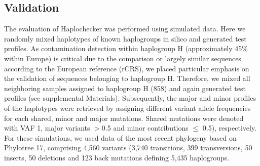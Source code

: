 \subsection{Validation}
The evaluation of Haplochecker  was performed using simulated data. Here we randomly mixed haplotypes of known haplogroups in silico and generated test profiles. As contamination detection within haplogroup H (approximately 45\% within Europe) is critical due to the comparison or largely similar sequences according to the European reference (rCRS), we placed particular emphasis on the validation of sequences belonging to haplogroup H. Therefore, we mixed all neighboring samples assigned to haplogroup H (858) and again generated test profiles (see supplemental Materials). Subsequently, the major and minor profiles of the haplotypes were retrieved by assigning different variant allele frequencies for each shared, minor and major mutations. Shared mutations were denoted with VAF 1, major variants $>$0.5 and minor contributions $\leq$ 0.5), respectively. For these simulations, we used data of the most recent phylogeny based on Phylotree 17, comprising 4,560 variants (3,740 transitions, 399 transversions, 50 inserts, 50 deletions and 123 back mutations defining 5,435 haplogroups. 

